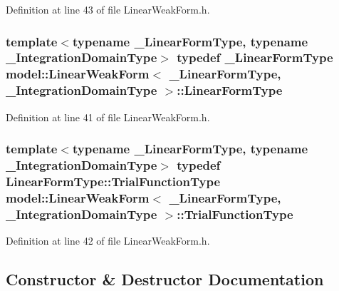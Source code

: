 Definition at line 43 of file Linear\+Weak\+Form.\+h.

\hypertarget{classmodel_1_1_linear_weak_form_a615022ae48cb4a4bdb80eaa954bf5e1e}{}
\subsubsection[{Linear\+Form\+Type}]{\setlength{\rightskip}{0pt plus 5cm}template$<$typename \+\_\+\+Linear\+Form\+Type, typename \+\_\+\+Integration\+Domain\+Type$>$ typedef \+\_\+\+Linear\+Form\+Type {\bf model\+::\+Linear\+Weak\+Form}$<$ \+\_\+\+Linear\+Form\+Type, \+\_\+\+Integration\+Domain\+Type $>$\+::{\bf Linear\+Form\+Type}}\label{classmodel_1_1_linear_weak_form_a615022ae48cb4a4bdb80eaa954bf5e1e}


Definition at line 41 of file Linear\+Weak\+Form.\+h.

\hypertarget{classmodel_1_1_linear_weak_form_a46fe3aab1c9664bb7a49d41b08e995ec}{}
\subsubsection[{Trial\+Function\+Type}]{\setlength{\rightskip}{0pt plus 5cm}template$<$typename \+\_\+\+Linear\+Form\+Type, typename \+\_\+\+Integration\+Domain\+Type$>$ typedef Linear\+Form\+Type\+::\+Trial\+Function\+Type {\bf model\+::\+Linear\+Weak\+Form}$<$ \+\_\+\+Linear\+Form\+Type, \+\_\+\+Integration\+Domain\+Type $>$\+::{\bf Trial\+Function\+Type}}\label{classmodel_1_1_linear_weak_form_a46fe3aab1c9664bb7a49d41b08e995ec}


Definition at line 42 of file Linear\+Weak\+Form.\+h.



\subsection{Constructor \& Destructor Documentation}
\hypertarget{classmodel_1_1_linear_weak_form_a178e12a54670fe4388ecf65de97f4baa}{}
